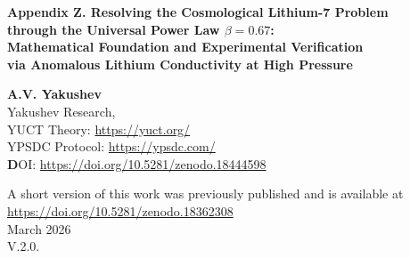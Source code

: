 \documentclass[12pt,a4paper]{article}
\theoremstyle{remark}
\begin{document}
	
	\begin{titlepage}
		\begin{center}
			\vspace*{0cm}
			
			\Huge \textbf{Appendix Z. Resolving the Cosmological Lithium-7 Problem} \\
			\Huge \textbf{through the Universal Power Law \(\beta = 0.67\):} \\
			\Huge \textbf{Mathematical Foundation and Experimental Verification} \\
			\Huge \textbf{via Anomalous Lithium Conductivity at High Pressure}
			
			\vspace{0.5cm}
			\Large \textbf{A.V. Yakushev} \\
			\large Yakushev Research, \\ 
	YUCT Theory: \url{https://yuct.org/}\\
YPSDC Protocol: \url{https://ypsdc.com/}\\


\vspace{2cm}
\textbf DOI: \url{https://doi.org/10.5281/zenodo.18444598}\\

\vspace{1cm}

\vspace{0cm}
\large 
A short version of this work was previously published and is available at\\ \url{https://doi.org/10.5281/zenodo.18362308}\\
\vspace{1cm}
March 2026 \\ \large V.2.0.
			
			
			\newpage
			\begin{minipage}{0.85\textwidth}
				\begin{abstract}
					\noindent
					We present a rigorous mathematical derivation of the universal conductivity power law $\sigma \propto (q-1)^{-\beta}$ with exponent $\beta = 0.67$, which follows from the Yakushev Unified Coordination Theory (YUCT). Using experimental data on the anomalous resistivity of lithium under shock compression up to 210 GPa (Fortov, Yakushev et al., 2001), we calibrate the model and demonstrate that the observed 15-fold increase in resistivity is a direct consequence of coordination effects. Three blind experimental predictions are proposed, including an isotope effect in conductivity $\sigma_6/\sigma_7 = (7/6)^{0.74} \approx 1.115$, which provides a decisive test of the theory. The results close the loop from cosmological lithium to laboratory measurements and establish $\beta = 0.67$ as a new fundamental constant.
				\end{abstract}
			\end{minipage}
			

\end{center}
\end{titlepage}
\end{document}
